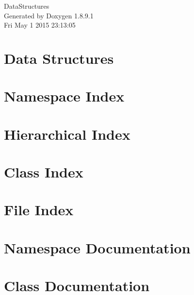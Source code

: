 \documentclass[twoside]{book}
\newcommand{\+}{\discretionary{\mbox{\scriptsize$\hookleftarrow$}}{}{}}
\newcommand{\clearemptydoublepage}{%
  \newpage{\pagestyle{empty}\cleardoublepage}%
}
\begin{document}
\hypersetup{pageanchor=false,
             bookmarks=true,
             bookmarksnumbered=true,
             pdfencoding=unicode
            }
\begin{titlepage}
\vspace*{7cm}
\begin{center}%
{\Large Data\+Structures }\\
\vspace*{1cm}
{\large Generated by Doxygen 1.8.9.1}\\
\vspace*{0.5cm}
{\small Fri May 1 2015 23:13:05}\\
\end{center}
\end{titlepage}
\clearemptydoublepage
\tableofcontents
\clearemptydoublepage
{}
\hypersetup{pageanchor=true}

\chapter{Data Structures}
\label{md__r_e_a_d_m_e}
\hypertarget{md__r_e_a_d_m_e}{}

\chapter{Namespace Index}

\chapter{Hierarchical Index}

\chapter{Class Index}

\chapter{File Index}

\chapter{Namespace Documentation}




\chapter{Class Documentation}















\end{document}
